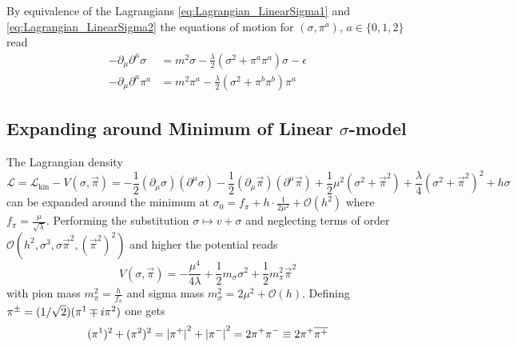 By equivalence of the Lagrangians \eqref{eq:Lagrangian_LinearSigma1} and \eqref{eq:Lagrangian_LinearSigma2} the equations of motion for $(\sigma,\pi^a)$, $a\in\{0,1,2\}$ read
\begin{subequations}
    \begin{align}
        -\partial_\mu\partial^\mu\sigma & =m^2\sigma-\frac{\lambda}{2}(\sigma^2+\pi^a\pi^a)\sigma-\epsilon \\
        -\partial_\mu\partial^\mu\pi^a  & =m^2\pi^a-\frac{\lambda}{2}(\sigma^2+\pi^b\pi^b)\pi^a
    \end{align}
\end{subequations}

\subsection{Expanding around Minimum of Linear $\sigma$-model}

The Lagrangian density
\begin{equation}
    \mathscr{L}=\mathcal{L}_{\text{kin}}-V(\sigma,\vec{\pi})=-\frac{1}{2}(\partial_\mu\sigma)(\partial^\mu\sigma)-\frac{1}{2}(\partial_\mu\vec{\pi})(\partial^\mu\vec{\pi})+\frac{1}{2}\mu^2(\sigma^2+\vec{\pi}^2)+\frac{\lambda}{4}(\sigma^2+\vec{\pi}^2)^2+h\sigma
\end{equation}
can be expanded around the minimum at $\sigma_0=f_\pi+h\cdot\frac{1}{2\mu^2}+\mathcal{O}(h^2)$ where $f_\pi=\frac{\mu}{\sqrt{\lambda}}$. Performing the substitution $\sigma\mapsto v+\sigma$ and neglecting terms of order $\mathcal{O}(h^2,\sigma^3,\sigma\vec{\pi}^2,(\vec{\pi}^2)^2)$ and higher the potential reads
\begin{equation}
    V(\sigma,\vec{\pi})=-\frac{\mu^4}{4\lambda}+\frac{1}{2}m_\sigma\sigma^2+\frac{1}{2}m_\pi^2\vec{\pi}^2
\end{equation}
with pion mass $m_\pi^2=\frac{h}{f_\pi}$ and sigma mass $m_\sigma^2=2\mu^2+\mathcal{O}(h)$. Defining $\pi^\pm=(1/\sqrt{2})(\pi^1\mp{i}\pi^2)$ one gets 
\begin{equation}
    (\pi^1)^2+(\pi^2)^2={\vert\pi^+\vert}^2+{\vert\pi^-\vert}^2=2\pi^+\pi^-\equiv 2\pi^+\overline{\pi^+}
\end{equation}

